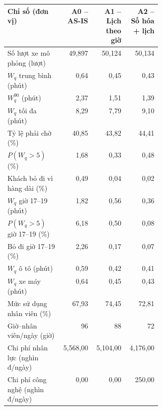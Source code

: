 \begin{tabular}{p{0.36\linewidth}rrr}
\toprule
\textbf{Chỉ số (đơn vị)} & \textbf{A0 -- AS-IS} & \textbf{A1 -- Lịch theo giờ} & \textbf{A2 -- Số hóa + lịch} \\
\midrule
Số lượt xe mô phỏng (lượt) & 49,897 & 50,124 & 50,134 \\
$W_q$ trung bình (phút) & 0{,}64 & 0{,}45 & 0{,}43 \\
$W_q^{90}$ (phút) & 2{,}37 & 1{,}51 & 1{,}39 \\
$W_q$ tối đa (phút) & 8{,}29 & 7{,}79 & 9{,}10 \\
Tỷ lệ phải chờ (\%) & 40{,}85 & 43{,}82 & 44{,}41 \\
$P(W_q>5)$ (\%) & 1{,}68 & 0{,}33 & 0{,}48 \\
Khách bỏ đi vì hàng dài (\%) & 0{,}49 & 0{,}04 & 0{,}02 \\
$W_q$ giờ 17--19 (phút) & 1{,}82 & 0{,}56 & 0{,}36 \\
$P(W_q>5)$ giờ 17--19 (\%) & 6{,}18 & 0{,}50 & 0{,}08 \\
Bỏ đi giờ 17--19 (\%) & 2{,}26 & 0{,}17 & 0{,}07 \\
$W_q$ ô tô (phút) & 0{,}59 & 0{,}42 & 0{,}41 \\
$W_q$ xe máy (phút) & 0{,}64 & 0{,}45 & 0{,}43 \\
Mức sử dụng nhân viên (\%) & 67{,}93 & 74{,}45 & 72{,}81 \\
Giờ--nhân viên/ngày (giờ) & 96 & 88 & 72 \\
Chi phí nhân lực (nghìn đ/ngày) & 5,568{,}00 & 5,104{,}00 & 4,176{,}00 \\
Chi phí công nghệ (nghìn đ/ngày) & 0{,}00 & 0{,}00 & 250{,}00 \\
\bottomrule
\end{tabular}
